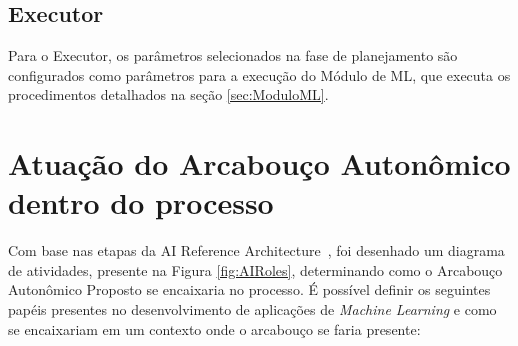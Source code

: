 \documentclass[portugues]{ic-tese}
\begin{document}
\subsection{Executor}

Para o Executor, os parâmetros selecionados na fase de planejamento são configurados como parâmetros para a execução do Módulo de ML, que executa os procedimentos detalhados na seção \ref{sec:ModuloML}.

\section{Atuação do Arcabouço Autonômico dentro do processo}

Com base nas etapas da AI Reference Architecture~\citep{IBM_2021}, foi desenhado um diagrama de atividades, presente na Figura \ref{fig:AIRoles}, determinando como o Arcabouço Autonômico Proposto se encaixaria no processo. É possível definir os seguintes papéis presentes no desenvolvimento de aplicações de \textit{Machine Learning} e como se encaixariam em um contexto onde o arcabouço se faria presente:
\end{document}
